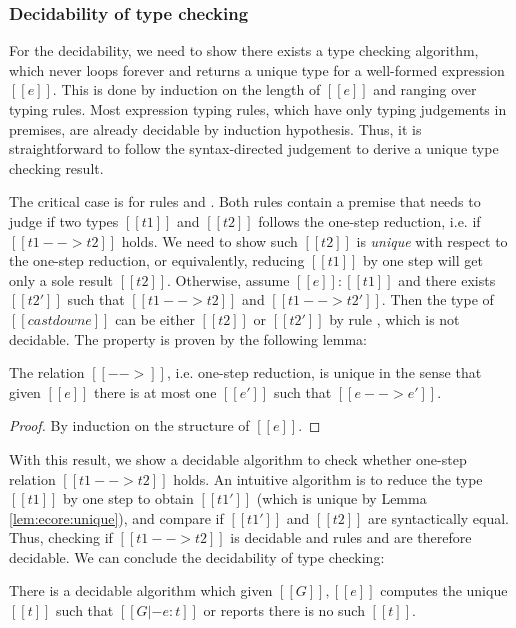 \subsubsection{Decidability of type checking}
For the decidability, we need to show there exists a type checking algorithm, which never loops forever and returns a unique type for a well-formed expression $[[e]]$. This is done by induction on the length of $[[e]]$ and ranging over typing rules. Most expression typing rules, which have only typing judgements in premises, are already decidable by induction hypothesis. Thus, it is straightforward to follow the syntax-directed judgement to derive a unique type checking result.

The critical case is for rules  and . Both rules contain a premise that needs to judge if two types $[[t1]]$ and $[[t2]]$ follows the one-step reduction, i.e. if $[[t1 --> t2]]$ holds. We need to show such $[[t2]]$ is \emph{unique} with respect to the one-step reduction, or equivalently, reducing $[[t1]]$ by one step will get only a sole result $[[t2]]$. Otherwise, assume $[[e]]:[[t1]]$ and there exists $[[t2']]$ such that $[[t1 --> t2]]$ and $[[t1 --> t2']]$. Then the type of $[[castdown e]]$ can be either $[[t2]]$ or $[[t2']]$ by rule , which is not decidable. The property is proven by the following lemma:

\begin{lem}\label{lem:ecore:unique}
	The relation $[[-->]]$, i.e. one-step reduction, is unique in the sense that given $[[e]]$ there is at most one $[[e']]$ such that $[[e --> e']]$.
\end{lem}

\begin{proof}
	By induction on the structure of $[[e]]$.
\end{proof}

With this result, we show a decidable algorithm to check whether one-step relation $[[t1 --> t2]]$ holds. An intuitive algorithm is to reduce the type $[[t1]]$ by one step to obtain $[[t1']]$ (which is unique by Lemma \ref{lem:ecore:unique}), and compare if $[[t1']]$ and $[[t2]]$ are syntactically equal. Thus, checking if $[[t1 --> t2]]$ is decidable and rules  and  are therefore decidable. We can conclude the decidability of type checking:

\begin{lem}\label{lem:ecore:decide}
	There is a decidable algorithm which given $[[G]], [[e]]$ computes the unique $[[t]]$ such that $[[G |- e:t]]$ or reports there is no such $[[t]]$.
\end{lem}

